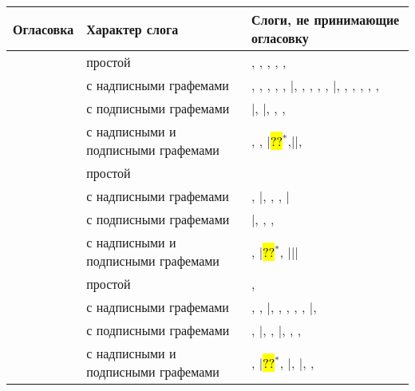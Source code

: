 \begin{tabularx}{\textwidth}{p{} p{} p{}}
	\caption{Слоги, не принимающие огласовку}
	\label{tab:2}\\
		\toprule
	\parbox{0.1\textwidth}{\centering Огла\-совка} & \parbox{0.4\textwidth}{\centering Характер слога} & \parbox{0.4\textwidth}{\centering Слоги, не принимающие огласовку}\\
	\midrule
	\endhead
	\addlinespace
	 & простой & , , , , , \\
	& с надписными графемами & , , , , , |\quad  {}, , , , , |\quad {}, , , , , , \\
	\addlinespace
	& с подписными графемами & |\quad {}, |\quad {}, , , \\
	\addlinespace
	& с надписными и подписными графемами & , , |\quad \hl{??}\hyperref[tab:2:spec1]{$^*$},|\quad {}|\quad {},\\ 
	\midrule
	\addlinespace
	 & простой & \\
	& с надписными графемами & , |\quad {}, , , |\quad {}\\
	\addlinespace
	& с подписными графемами & |\quad {}, , , \\
	\addlinespace
	& с надписными и подписными графемами & , |\quad \hl{??}\hyperref[tab:2:spec1]{$^*$}, |\quad {}|\quad {}|\quad {}\\
	\midrule
	\addlinespace
	 & простой & , \\
	& с надписными графемами & , , |\quad {}, , , , , |\quad {}, \\
	\addlinespace
	& с подписными графемами & , |\quad {}, , |\quad {}, , , \\
	\addlinespace
	& с надписными и подписными графемами & , |\quad \hl{??}\hyperref[tab:2:spec1]{$^*$}, |\quad {}, |\quad {}, , \\

\end{tabularx}
